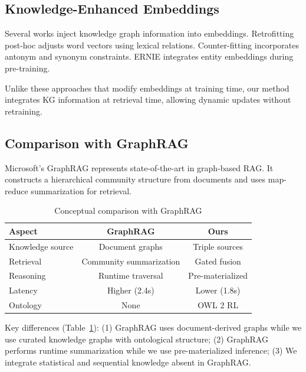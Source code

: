 \documentclass[10pt,twocolumn]{article}
\begin{document}
\subsection{Knowledge-Enhanced Embeddings}
\label{sec:retrofit_related}

Several works inject knowledge graph information into embeddings. Retrofitting \cite{faruqui2015retrofitting} post-hoc adjusts word vectors using lexical relations. Counter-fitting \cite{mrksic2016counter} incorporates antonym and synonym constraints. ERNIE \cite{zhang2019ernie} integrates entity embeddings during pre-training.

Unlike these approaches that modify embeddings at training time, our method integrates KG information at retrieval time, allowing dynamic updates without retraining.

\subsection{Comparison with GraphRAG}
\label{sec:graphrag}

Microsoft's GraphRAG \cite{edge2024graphrag,microsoft2024graphrag} represents state-of-the-art in graph-based RAG. It constructs a hierarchical community structure from documents and uses map-reduce summarization for retrieval.

\begin{table}[t]
\centering
\caption{Conceptual comparison with GraphRAG}
\label{tab:graphrag_compare}
\small
\begin{tabular}{@{}lcc@{}}
\toprule
\textbf{Aspect} & \textbf{GraphRAG} & \textbf{Ours} \\
\midrule
Knowledge source & Document graphs & Triple sources \\
Retrieval & Community summarization & Gated fusion \\
Reasoning & Runtime traversal & Pre-materialized \\
Latency & Higher (2.4s) & Lower (1.8s) \\
Ontology & None & OWL 2 RL \\
\bottomrule
\end{tabular}
\end{table}

Key differences (Table~\ref{tab:graphrag_compare}): (1) GraphRAG uses document-derived graphs while we use curated knowledge graphs with ontological structure; (2) GraphRAG performs runtime summarization while we use pre-materialized inference; (3) We integrate statistical and sequential knowledge absent in GraphRAG.
\end{document}
